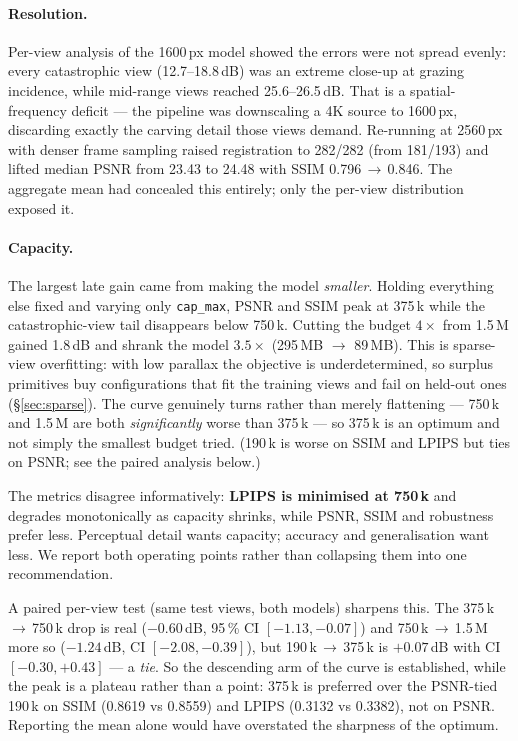 \paragraph{Resolution.}
\label{sec:res}
Per-view analysis of the 1600\,px model showed the errors were not spread evenly:
every catastrophic view (12.7--18.8\,dB) was an extreme close-up at grazing
incidence, while mid-range views reached 25.6--26.5\,dB. That is a
spatial-frequency deficit --- the pipeline was downscaling a 4K source to 1600\,px,
discarding exactly the carving detail those views demand. Re-running at 2560\,px
with denser frame sampling raised registration to 282/282 (from 181/193) and lifted
median PSNR from 23.43 to 24.48 with SSIM 0.796\,$\rightarrow$\,0.846. The aggregate
mean had concealed this entirely; only the per-view distribution exposed it.

\paragraph{Capacity.}
\label{sec:capacity}
The largest late gain came from making the model \emph{smaller}. Holding everything
else fixed and varying only \texttt{cap\_max}, PSNR and SSIM peak at 375\,k while
the catastrophic-view tail disappears below 750\,k. Cutting the budget $4\times$
from 1.5\,M gained 1.8\,dB and shrank the model $3.5\times$ (295\,MB
$\rightarrow$ 89\,MB). This is sparse-view overfitting: with low parallax the
objective is underdetermined, so surplus primitives buy configurations that fit the
training views and fail on held-out ones (\S\ref{sec:sparse}). The curve genuinely
turns rather than merely flattening --- 750\,k and 1.5\,M are both \emph{significantly}
worse than 375\,k --- so 375\,k is an optimum and not simply the smallest budget tried.
(190\,k is worse on SSIM and LPIPS but ties on PSNR; see the paired analysis below.)

The metrics disagree informatively: \textbf{LPIPS is minimised at 750\,k} and
degrades monotonically as capacity shrinks, while PSNR, SSIM and robustness prefer
less. Perceptual detail wants capacity; accuracy and generalisation want less. We
report both operating points rather than collapsing them into one recommendation.

A paired per-view test (same test views, both models) sharpens this. The
375\,k\,$\rightarrow$\,750\,k drop is real ($-0.60$\,dB, 95\,\% CI $[-1.13, -0.07]$)
and 750\,k\,$\rightarrow$\,1.5\,M more so ($-1.24$\,dB, CI $[-2.08, -0.39]$), but
190\,k\,$\rightarrow$\,375\,k is $+0.07$\,dB with CI $[-0.30, +0.43]$ --- a
\emph{tie}. So the descending arm of the curve is established, while the peak is a
plateau rather than a point: 375\,k is preferred over the PSNR-tied 190\,k on SSIM
(0.8619 vs 0.8559) and LPIPS (0.3132 vs 0.3382), not on PSNR. Reporting the mean
alone would have overstated the sharpness of the optimum.

